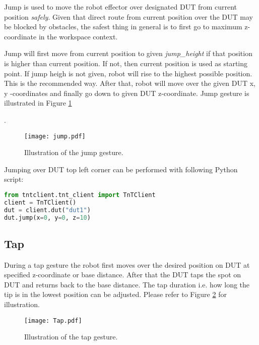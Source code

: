 Jump is used to move the robot effector over designated DUT from current position \emph{safely}. Given that direct route from current position over the DUT may be blocked by obstacles, the safest thing in general is to first go to maximum z-coordinate in the workspace context.

Jump will first move from current position to given \emph{jump\_height} if that position is higher than current position. If not, then current position is used as starting point. If jump heigh is not given, robot will rise to the highest possible position. This is the recommended way. After that, robot will move over the given DUT x, y -coordinates and finally go down to given DUT z-coordinate. Jump gesture is illustrated in Figure \ref{fig:tap_jump}

.

\begin{figure}[h]
	\centering
	\texttt{[image: jump.pdf]}
	\caption{Illustration of the jump gesture.}
	\label{fig:tap_jump}
\end{figure}

Jumping over DUT top left corner can be performed with following Python script:

\begin{lstlisting}[language=Python]
from tntclient.tnt_client import TnTClient
client = TnTClient()
dut = client.dut("dut1")
dut.jump(x=0, y=0, z=10)
\end{lstlisting}

\subsection{Tap} 

During a tap gesture the robot first moves over the desired position on DUT at specified z-coordinate or base distance. After that the DUT taps the spot on DUT and returns back to the base distance. The tap duration i.e. how long the tip is in the lowest position can be adjusted. Please refer to Figure \ref{fig:tap_gesture} for illustration.

\begin{figure}[h]
	\centering
	\texttt{[image: Tap.pdf]}
	\caption{Illustration of the tap gesture.}
	\label{fig:tap_gesture}
\end{figure}

